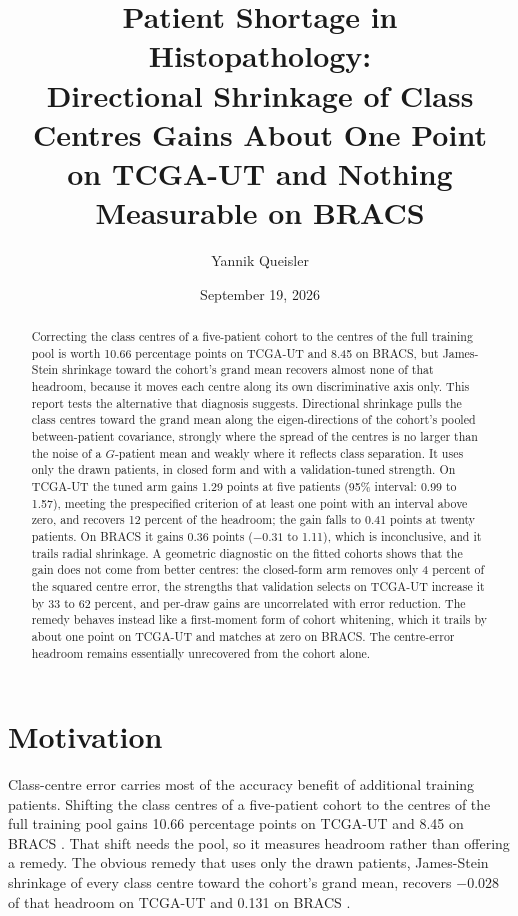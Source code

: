 \documentclass[11pt]{article}
\title{Patient Shortage in Histopathology:\\Directional Shrinkage of Class Centres Gains About One Point\\on TCGA-UT and Nothing Measurable on BRACS}
\author{Yannik Queisler}
\date{September 19, 2026}
\begin{document}
\raggedbottom
{}
\setlength{\emergencystretch}{2em}
\maketitle
\begin{abstract}
\noindent Correcting the class centres of a five-patient cohort to the centres of the full training pool is worth 10.66 percentage points on TCGA-UT and 8.45 on BRACS, but James-Stein shrinkage toward the cohort's grand mean recovers almost none of that headroom, because it moves each centre along its own discriminative axis only. This report tests the alternative that diagnosis suggests. Directional shrinkage pulls the class centres toward the grand mean along the eigen-directions of the cohort's pooled between-patient covariance, strongly where the spread of the centres is no larger than the noise of a $G$-patient mean and weakly where it reflects class separation. It uses only the drawn patients, in closed form and with a validation-tuned strength. On TCGA-UT the tuned arm gains 1.29 points at five patients (95\% interval: 0.99 to 1.57), meeting the prespecified criterion of at least one point with an interval above zero, and recovers 12 percent of the headroom; the gain falls to 0.41 points at twenty patients. On BRACS it gains 0.36 points ($-0.31$ to 1.11), which is inconclusive, and it trails radial shrinkage. A geometric diagnostic on the fitted cohorts shows that the gain does not come from better centres: the closed-form arm removes only 4 percent of the squared centre error, the strengths that validation selects on TCGA-UT increase it by 33 to 62 percent, and per-draw gains are uncorrelated with error reduction. The remedy behaves instead like a first-moment form of cohort whitening, which it trails by about one point on TCGA-UT and matches at zero on BRACS. The centre-error headroom remains essentially unrecovered from the cohort alone.
\end{abstract}

\section{Motivation}
\label{sec:motivation}
Class-centre error carries most of the accuracy benefit of additional training patients. Shifting the class centres of a five-patient cohort to the centres of the full training pool gains 10.66 percentage points on TCGA-UT and 8.45 on BRACS \citep{queisler2026centreError,queisler2026bracsMechanism}. That shift needs the pool, so it measures headroom rather than offering a remedy. The obvious remedy that uses only the drawn patients, James-Stein shrinkage of every class centre toward the cohort's grand mean, recovers $-0.028$ of that headroom on TCGA-UT and 0.131 on BRACS \citep{queisler2026centreShrinkage}.
\end{document}

